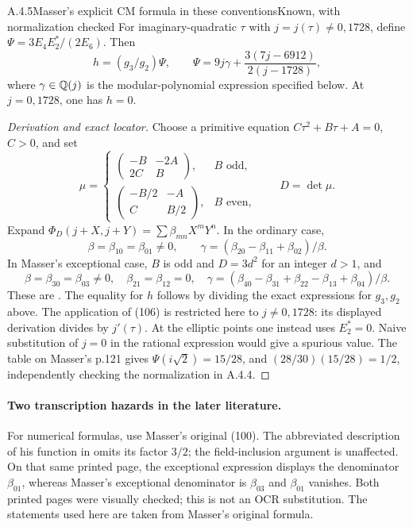 \begin{result}{A.4.5}{Masser's explicit CM formula in these conventions}{Known, with normalization checked}
For imaginary-quadratic $\tau$ with $j=j(\tau)\ne0,1728$, define $\Psi=3E_4E_2^*/(2E_6)$. Then
\[
 h=(g_3/g_2)\Psi,\qquad
 \Psi=9j\gamma+\frac{3(7j-6912)}{2(j-1728)},
\]
where $\gamma\in\mathbb Q(j)$ is the modular-polynomial expression specified below. At $j=0,1728$, one has $h=0$.
\end{result}
\begin{proof}[Derivation and exact locator]
Choose a primitive equation $C\tau^2+B\tau+A=0$, $C>0$, and set
\[
 \mu=\begin{cases}
 \begin{pmatrix}-B&-2A\\2C&B\end{pmatrix},&B\text{ odd},\\[2mm]
 \begin{pmatrix}-B/2&-A\\C&B/2\end{pmatrix},&B\text{ even},
 \end{cases}\qquad D=\det\mu.
\]
Expand $\Phi_D(j+X,j+Y)=\sum\beta_{mn}X^mY^n$. In the ordinary case,
\[
 \beta=\beta_{10}=\beta_{01}\ne0,\qquad
 \gamma=(\beta_{20}-\beta_{11}+\beta_{02})/\beta.
\]
In Masser's exceptional case, $B$ is odd and $D=3d^2$ for an integer $d>1$, and
\[
 \beta=\beta_{30}=\beta_{03}\ne0,\quad \beta_{21}=\beta_{12}=0,
 \quad \gamma=(\beta_{40}-\beta_{31}+\beta_{22}-\beta_{13}+\beta_{04})/\beta.
\]
These are \cite[Lemmas A1--A2, pp.116--118, and (105)--(106), pp.118--119]{EllMasser1975}. The equality for $h$ follows by dividing the exact expressions for $g_3,g_2$ above. The application of (106) is restricted here to $j\ne0,1728$: its displayed derivation divides by $j'(\tau)$. At the elliptic points one instead uses $E_2^*=0$. Naive substitution of $j=0$ in the rational expression would give a spurious value. The table on Masser's p.121 gives $\Psi(i\sqrt2)=15/28$, and $(28/30)(15/28)=1/2$, independently checking the normalization in A.4.4.
\end{proof}

\paragraph{Two transcription hazards in the later literature.}
For numerical formulas, use Masser's original (100). The abbreviated description of his function in \cite[p.774]{EllSpence2018} omits its factor $3/2$; the field-inclusion argument is unaffected. On that same printed page, the exceptional expression displays the denominator $\beta_{01}$, whereas Masser's exceptional denominator is $\beta_{03}$ and $\beta_{01}$ vanishes. Both printed pages were visually checked; this is not an OCR substitution. The statements used here are taken from Masser's original formula.

